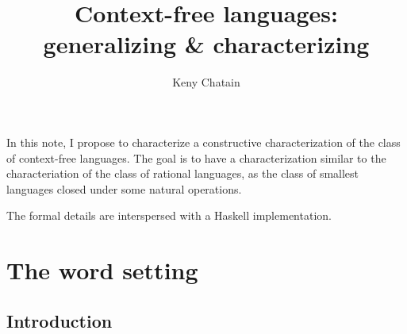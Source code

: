 


\endofdump

\title{Context-free languages: generalizing \& characterizing}
\author{Keny Chatain}


\maketitle

In this note, I propose to characterize a constructive characterization of the class of context-free languages. The goal is to have a characterization similar to the characteriation of the class of rational languages, as the class of smallest languages closed under some natural operations.

The formal details are interspersed with a Haskell implementation.

\section{The word setting}

\subsection{Introduction}

